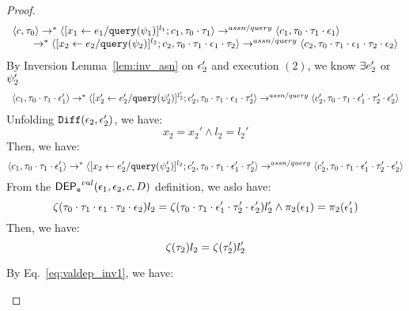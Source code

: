 \begin{proof}
\begin{equation}
\label{eq:valdep_inv1}
  \begin{array}{l}   
\langle {c}, \mathtt{\tau}_0 \rangle \rightarrow^{*} 
\langle [\mathrel{ {x}_1 \leftarrow e_1 / {\tt query}(\psi_1) }]^{l_1} ; {c}_1, \mathtt{\tau}_0 \cdot \mathtt{\tau}_1 \rangle  
\rightarrow^{assn/query}
 \langle c_1, \mathtt{\tau}_0 \cdot \mathtt{\tau}_1 \cdot \mathtt{\epsilon}_1 \rangle \\
  \qquad \rightarrow^{*} 
  \langle [\mathrel{ {x}_2 \leftarrow e_2 / {\tt query}(\psi_2) }]^{l_2};{c}_2, 
  \mathtt{\tau}_0 \cdot \mathtt{\tau}_1 \cdot \mathtt{\epsilon}_1 \cdot \mathtt{\tau}_2 \rangle 
  \rightarrow^{assn/query} 
  \langle {c}_2,  \mathtt{\tau}_0 \cdot \mathtt{\tau}_1 \cdot \mathtt{\epsilon}_1 \cdot \mathtt{\tau}_2 \cdot \mathtt{\epsilon}_2 \rangle 
\end{array}
\end{equation}
%
%
By Inversion Lemma~\ref{lem:inv_asn} on 
$\mathtt{\epsilon}_2'$ and execution $(2)$, we know $\exists e_2'$ or $\psi_2'$
 \[
  \begin{array}{l}   
  \langle c_1, \mathtt{\tau}_0 \cdot \mathtt{\tau}_1 \cdot \mathtt{\epsilon}_1' \rangle 
  \rightarrow^{*} 
  \langle [\mathrel{ {x}_2' \leftarrow e_2' / {\tt query}(\psi_2') }]^{l_2'} ; {c}_2', \mathtt{\tau}_0 \cdot \mathtt{\tau}_1 \cdot \mathtt{\epsilon}_1 \cdot \mathtt{\tau}_2' \rangle 
  \rightarrow^{assn/query} 
  \langle {c}_2',  \mathtt{\tau}_0 \cdot \mathtt{\tau}_1 \cdot \mathtt{\epsilon}_1' \cdot \mathtt{\tau}_2' \cdot \mathtt{\epsilon}_2' \rangle 
\end{array}
 \]
%
Unfolding $\mathtt{Diff}(\mathtt{\epsilon}_2,\mathtt{\epsilon}_2')$, we have:
\[
  x_2 = x_2' \land l_2 = l_2' 
\] 
%
Then, we have:
\begin{equation}
\label{eq:valdep_inv2}
  \langle c_1, \mathtt{\tau}_0 \cdot \mathtt{\tau}_1 \cdot \mathtt{\epsilon}_1' \rangle 
  \rightarrow^{*} 
  \langle [\mathrel{ {x}_2 \leftarrow e_2' / {\tt query}(\psi_2') }]^{l_2} ; {c}_2', \mathtt{\tau}_0 \cdot \mathtt{\tau}_1 \cdot \mathtt{\epsilon}_1' \cdot \mathtt{\tau}_2' \rangle 
  \rightarrow^{assn/query} 
  \langle {c}_2',  \mathtt{\tau}_0 \cdot \mathtt{\tau}_1 \cdot \mathtt{\epsilon}_1' \cdot \mathtt{\tau}_2' \cdot \mathtt{\epsilon}_2' \rangle 
\end{equation}
%
From the $\mathsf{DEP_{\mathtt{e}}}^{val}(\mathtt{\epsilon}_1, \mathtt{\epsilon}_2, c, D)$ definition, we aslo have:
\[
  \mathtt{\zeta}(\mathtt{\tau}_0 \cdot \mathtt{\tau}_1 \cdot \mathtt{\epsilon}_1 \cdot \mathtt{\tau}_2 \cdot \mathtt{\epsilon}_2) l_2 = 
  \mathtt{\zeta}(\mathtt{\tau}_0 \cdot \mathtt{\tau}_1 \cdot \mathtt{\epsilon}_1' \cdot \mathtt{\tau}_2' \cdot \mathtt{\epsilon}_2') l_2'
  \land 
  \pi_2(\mathtt{\epsilon}_1) = \pi_2(\mathtt{\epsilon}_1')
\] 
Then, we have:
\begin{equation}
\label{eq:valdep_invn}
   \mathtt{\zeta}(\mathtt{\tau}_2) l_2 = 
  \mathtt{\zeta}(\mathtt{\tau}_2') l_2'
\end{equation}
%
\begin{case}[$\trace_2 = \cdot$]
\label{case:valdep_base}
%
%
 By Eq.~\ref{eq:valdep_inv1}, we have:

\end{case}
\end{proof}
